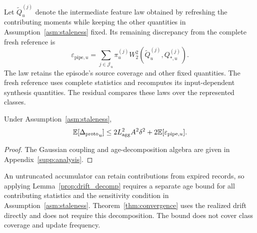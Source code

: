 Let $\widetilde Q_u^{(j)}$ denote the intermediate feature law obtained by refreshing the contributing moments while keeping the other quantities in Assumption~\ref{asm:staleness} fixed. Its remaining discrepancy from the complete fresh reference is
\begin{equation}
 \varepsilon_{\mathrm{pipe},u}
 =\sum_{j\in\mathcal J_u}\pi_u^{(j)}
 W_2^2(\widetilde Q_u^{(j)},Q_{*,u}^{(j)}).
 \label{eq:coverage_error}
\end{equation}
The law retains the episode's source coverage and other fixed quantities. The fresh reference uses complete statistics and recomputes its input-dependent synthesis quantities. The residual compares these laws over the represented classes.

\begin{lemma}
\label{prop:drift_decomp}
Under Assumption~\ref{asm:staleness},
\begin{equation}
 \mathbb E[{\Delta_{\mathrm{proto}}}_u]\le
 2L_{\mathrm{agg}}^2A^2\delta^2
 +2\mathbb E[\varepsilon_{\mathrm{pipe},u}].
 \label{eq:drift_bound}
\end{equation}
\end{lemma}
\begin{proof}

The Gaussian coupling and age-decomposition algebra are given in Appendix~\ref{supp:analysis}.
\end{proof}

An untruncated accumulator can retain contributions from expired records, so applying Lemma~\ref{prop:drift_decomp} requires a separate age bound for all contributing statistics and the sensitivity condition in Assumption~\ref{asm:staleness}. Theorem~\ref{thm:convergence} uses the realized drift directly and does not require this decomposition. The bound does not cover class coverage and update frequency.